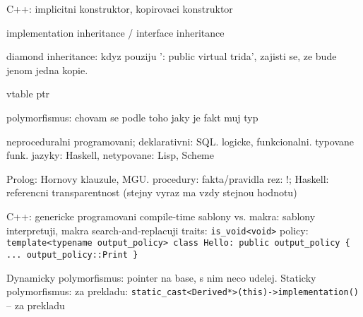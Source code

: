 C++: implicitni konstruktor, kopirovaci konstruktor

implementation inheritance / interface inheritance

diamond inheritance: kdyz pouziju ': public virtual trida', zajisti se, ze bude
jenom jedna kopie.

vtable ptr

polymorfismus: chovam se podle toho jaky je fakt muj typ

neproceduralni programovani; deklarativni: SQL. logicke, funkcionalni.
typovane funk. jazyky: Haskell, netypovane: Lisp, Scheme

Prolog: Hornovy klauzule, MGU.
procedury: fakta/pravidla
rez: !; Haskell: referencni transparentnost (stejny vyraz ma vzdy stejnou
hodnotu)

C++: genericke programovani compile-time
sablony vs. makra: sablony interpretuji, makra search-and-replacuji
traits: \verb#is_void<void>#
policy: \verb#template<typename output_policy> class Hello: public output_policy { ... output_policy::Print }#

Dynamicky polymorfismus: pointer na base, s nim neco udelej.
Staticky polymorfismus: za prekladu:
\verb#static_cast<Derived*>(this)->implementation()# -- za prekladu
